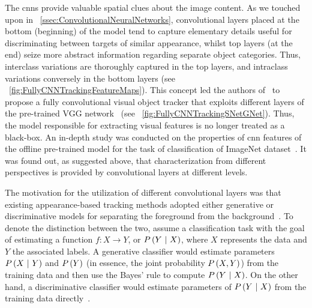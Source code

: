 The \glspl{cnn} provide valuable spatial clues about the image content. As we touched upon in \sectionstr{}~\ref{ssec:ConvolutionalNeuralNetworks}, convolutional layers placed at the bottom (beginning) of the model tend to capture elementary details useful for discriminating between targets of similar appearance, whilst top layers (at the end) seize more abstract information regarding separate object categories. Thus, interclass variations are thoroughly captured in the top layers, and intraclass variations conversely in the bottom layers (see \figstr{}~\ref{fig:FullyCNNTrackingFeatureMaps}). This concept led the authors of~\cite{wang2015votcnn} to propose a fully convolutional visual object tracker that exploits different layers of the pre-trained VGG network~\cite{simonyan2015verydeepcnn} (see \figstr{}~\ref{fig:FullyCNNTrackingSNetGNet}). Thus, the model responsible for extracting visual features is no longer treated as a black-box. An in-depth study was conducted on the properties of \gls{cnn} features of the offline pre-trained model for the task of classification of ImageNet dataset~\cite{deng2009imagenet}. It was found out, as suggested above, that characterization from different perspectives is provided by convolutional layers at different levels.

The motivation for the utilization of different convolutional layers was that existing appearance-based tracking methods adopted either generative or discriminative models for separating the foreground from the background~\cite{wang2015votcnn}. To denote the distinction between the two, assume a classification task with the goal of estimating a function $f: X \to Y$, or $P \left( Y \ | \ X \right)$, where $X$ represents the data and $Y$ the associated labels. A generative classifier would estimate parameters $P \left( X \ | \ Y \right)$ and $P \left( Y \right)$ (in essence, the joint probability $P \left( X, Y \right)$) from the training data and then use the Bayes' rule to compute $P \left( Y \ | \ X \right)$. On the other hand, a discriminative classifier would estimate parameters of $P \left( Y \ | \ X \right)$ from the training data directly~\cite{ng2002discriminative}.

